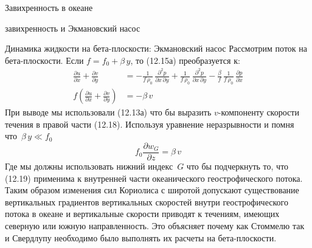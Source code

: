 \begin{chapter}{Завихренность в океане}
\begin{section}{завихренность и Экмановский насос}
\begin{paragraph}{Динамика жидкости на бета-плоскости: Экмановский насос}
Рассмотрим поток на бета-плоскости. Если $f = f_0 + \beta\,y$, то
(12.15а) преобразуется к:
\begin{align}
\frac{\partial{u}}{\partial{x}} + \frac{\partial{v}}{\partial{y}} 
  &= - \frac{1}{f\,\rho_{0}}\, \frac{\partial ^2 p}{\partial{x}\,\partial{y}} 
     + \frac{1}{f\,\rho_{0}} \, \frac{\partial ^2 p}{\partial{x}\,\partial{y}} 
     - \frac{\beta}{f} \,\frac{1}{f\,\rho_{0}}\,\frac{\partial{p}}{\partial{x}} \\
f \left( \frac{\partial{u}}{\partial{x}} + \frac{\partial{v}}{\partial{y}} \right) 
  &= - \beta \, v
\end{align}
При выводе мы использовали (12.13а) что бы выразить $v$-компоненту
скорости течения в правой части (12.18).  Используя уравнение
неразрывности и помня что~$\beta\, y \ll f_0$
\begin{equation}
f_0 \frac{\partial{w_G}}{\partial{z}} = \beta \, v
\end{equation}
Где мы должны использовать нижний индекс~$G$ что бы подчеркнуть то, что
(12.19) применима к внутренней части океанического геострофического
потока. Таким образом изменения сил Кориолиса с широтой допускают
существование вертикальных градиентов вертикальных скоростей внутри
геострофического потока в океане и вертикальные скорости приводят к
течениям, имеющих северную или южную направленность. Это объясняет
почему как Стоммелю так и Свердлупу необходимо было выполнять их
расчеты на бета-плоскости.
%
%
\end{paragraph}


\end{section}
\end{chapter}
